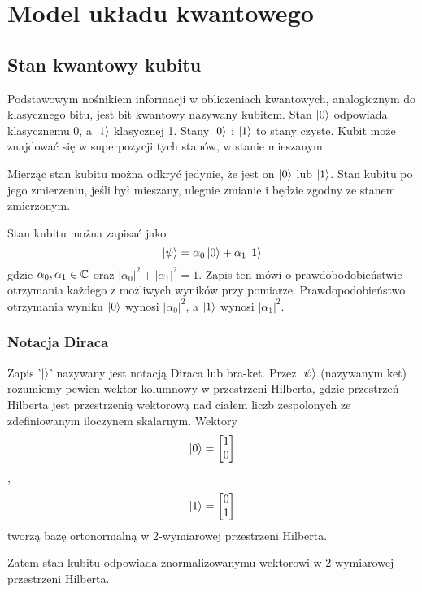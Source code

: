 \chapter{Model układu kwantowego}
\thispagestyle{chapterBeginStyle}
\label{rozdzial0b}
\section{Stan kwantowy kubitu}
Podstawowym nośnikiem informacji w obliczeniach kwantowych, analogicznym do klasycznego bitu, jest bit kwantowy nazywany kubitem. Stan $\ket{0}$ odpowiada klasycznemu 0, a $\ket{1}$ klasycznej 1. Stany $\ket{0}$ i $\ket{1}$ to stany czyste. Kubit może znajdować się w superpozycji tych stanów, w stanie mieszanym. 
\par Mierząc stan kubitu można odkryć jedynie, że jest on $\ket{0}$ lub $\ket{1}$. Stan kubitu po jego zmierzeniu, jeśli był mieszany, ulegnie zmianie i będzie zgodny ze stanem zmierzonym.
\par Stan kubitu można zapisać jako
\[\ket{\psi} = \alpha_0\ket{0} + \alpha_1\ket{1}\]
gdzie $\alpha_0, \alpha_1 \in \mathbb{C}$ oraz $\left|\alpha_0\right|^2 + \left|\alpha_1\right|^2 = 1$. Zapis ten mówi o prawdobodobieństwie otrzymania każdego z możliwych wyników przy pomiarze. Prawdopodobieństwo otrzymania wyniku $\ket{0}$ wynosi $\left|\alpha_0\right|^2$, a $\ket{1}$ wynosi $\left|\alpha_1\right|^2$.
\subsection{Notacja Diraca}
Zapis '$\ket{}$' nazywany jest notacją Diraca lub bra-ket. 
Przez $\ket{\psi}$ (nazywanym ket) rozumiemy pewien wektor kolumnowy w przestrzeni Hilberta, gdzie przestrzeń Hilberta jest przestrzenią wektorową nad ciałem liczb zespolonych ze zdefiniowanym iloczynem skalarnym.
Wektory 
\[
    \ket{0}
    =
    \begin{bmatrix}
        1 \\
        0 \\
    \end{bmatrix}
\], 
\[
    \ket{1}
    =
    \begin{bmatrix}
        0 \\
        1 \\
    \end{bmatrix}
\] tworzą bazę ortonormalną w 2-wymiarowej przestrzeni Hilberta.
\par Zatem stan kubitu odpowiada znormalizowanymu wektorowi w 2-wymiarowej przestrzeni Hilberta.
